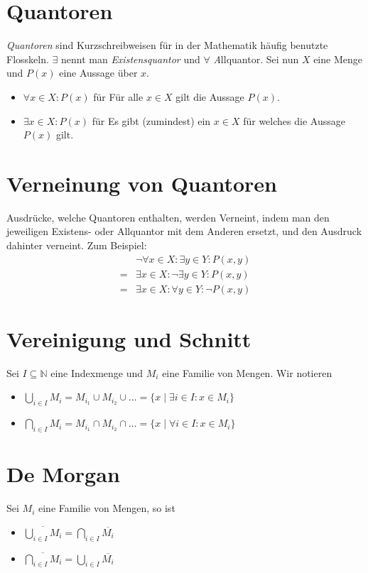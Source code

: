 \documentclass{scrreprt}
\newcommand{\NN}{\mathbb{N}}
\begin{document}
    \section{Quantoren}
    \emph{Quantoren} sind Kurzschreibweisen für in der Mathematik häufig benutzte Flosskeln. $\exists$ nennt man \emph{Existensquantor} und $\forall$ \emph Allquantor. Sei nun $X$ eine Menge und $P(x)$ eine Aussage über $x$.
    \begin{itemize}
        \item
            $\forall x \in X : P(x)$ für \glqq Für alle $x \in X$ gilt die Aussage $P(x)$.\grqq
        \item
            $\exists x \in X : P(x)$ für \glqq Es gibt (zumindest) ein $x \in X$ für welches die Aussage $P(x)$ gilt.\grqq
    \end{itemize}

    \section{Verneinung von Quantoren}
    Ausdrücke, welche Quantoren enthalten, werden Verneint, indem man den jeweiligen Existens- oder Allquantor mit dem Anderen ersetzt, und den Ausdruck dahinter verneint. Zum Beispiel:
    \begin{align*}
         & \neg \forall x \in X: \exists y \in Y : P (x,y)\\
        =& \exists x \in X: \neg \exists y \in Y : P(x,y)\\
        =& \exists x \in X: \forall y \in Y: \neg P(x,y)
    \end{align*}

    \section{Vereinigung und Schnitt}
    Sei $I \subseteq \NN$ eine Indexmenge und $M_i$ eine Familie von Mengen. Wir notieren
    \begin{itemize}
        \item
            $\bigcup\limits_{i \in I} M_i = M_{i_1} \cup M_{i_2} \cup \dots = \lbrace x \mid \exists i \in I: x \in M_i\rbrace$
        \item
            $\bigcap\limits_{i \in I} M_i = M_{i_1} \cap M_{i_2} \cap \dots = \lbrace x \mid \forall i \in I: x \in M_i\rbrace$
    \end{itemize}

    \section{De Morgan}
    Sei $M_i$ eine Familie von Mengen, so ist
    \begin{itemize}
        \item
             $\overline{\bigcup\limits_{i \in I} M_i} = \bigcap\limits_{i \in I} \overline{M_i} $
        \item
             $\overline{\bigcap\limits_{i \in I} M_i} = \bigcup\limits_{i \in I} \overline{M_i} $
    \end{itemize}
\end{document}
